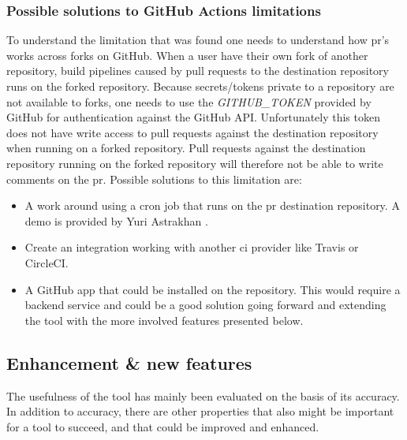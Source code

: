 \documentclass{report}
\begin{document}
\subsubsection{Possible solutions to GitHub Actions limitations}

\label{possible-solutions}
To understand the limitation that was found one needs to understand how \gls{pr}'s works across forks on GitHub. When a user have their own fork of another repository, build pipelines caused by pull requests to the destination repository runs on the forked repository. Because secrets/tokens private to a repository are not available to forks, one needs to use the \textit{GITHUB\_TOKEN} provided by GitHub for authentication against the GitHub API. Unfortunately this token does not have write access to pull requests against the destination repository when running on a forked repository. Pull requests against the destination repository running on the forked repository will therefore not be able to write comments on the \gls{pr}. Possible solutions to this limitation are: 
\begin{itemize}
    \item A work around using a cron job that runs on the \gls{pr} destination repository. A demo is provided by Yuri Astrakhan \cite{workaround-demo}. 
    
    \item Create an integration working with another \gls{ci} provider like Travis or CircleCI. 
    
    \item A GitHub app that could be installed on the repository. This would require a backend service and could be a good solution going forward and extending the tool with the more involved features presented below.
\end{itemize}

\label{futurework}


\subsection{Enhancement \& new features}

The usefulness of the tool has mainly been evaluated on the basis of its accuracy. In addition to accuracy, there are other properties that also might be important for a tool to succeed, and that could be improved and enhanced. 
\end{document}
